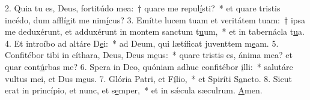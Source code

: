 2. Quia tu es, Deus, fortitúdo mea:~† quare me repul\uline{í}sti?~* et quare tristis incédo, dum afflígit me nim\uline{í}cus?
3. Emítte lucem tuam et veritátem tuam:~† ipsa me deduxérunt, et adduxérunt in montem sanctum t\uline{u}um,~* et in tabernácla t\uline{u}a.
4. Et introíbo ad altáre D\uline{e}i:~* ad Deum, qui lætíficat juventtem m\uline{e}am.
5. Confitébor tibi in cíthara, Deus, Deus m\uline{e}us:~* quare tristis es, ánima mea? et quar cont\uline{ú}rbas me?
6. Spera in Deo, quóniam adhuc confitébor \uline{i}lli:~* salutáre vultus mei, et Dus m\uline{e}us.
7. Glória Patri, et F\uline{í}lio,~* et Spiríti S\uline{a}ncto.
8. Sicut erat in princípio, et nunc, et s\uline{e}mper,~* et in sǽcula sæculrum. \uline{A}men.
